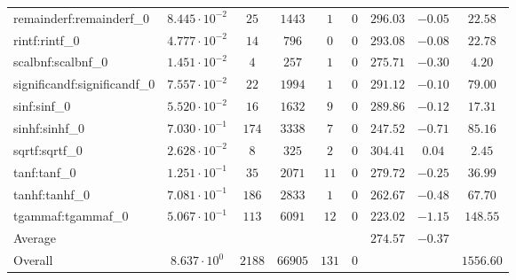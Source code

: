 \begin{tabular}{|l|c|c|c|c|c|c|c|c|}
remainderf:remainderf\_0     & $ 8.445 \cdot 10^{-2} $ & $ 25     $ & $ 1443  $ & $ 1   $ & $ 0   $ & $ 296.03      $ & $ -0.05   $ & $ 22.58   $ \\
rintf:rintf\_0               & $ 4.777 \cdot 10^{-2} $ & $ 14     $ & $ 796   $ & $ 0   $ & $ 0   $ & $ 293.08      $ & $ -0.08   $ & $ 22.78   $ \\
scalbnf:scalbnf\_0           & $ 1.451 \cdot 10^{-2} $ & $ 4      $ & $ 257   $ & $ 1   $ & $ 0   $ & $ 275.71      $ & $ -0.30   $ & $ 4.20    $ \\
significandf:significandf\_0 & $ 7.557 \cdot 10^{-2} $ & $ 22     $ & $ 1994  $ & $ 1   $ & $ 0   $ & $ 291.12      $ & $ -0.10   $ & $ 79.00   $ \\
sinf:sinf\_0                 & $ 5.520 \cdot 10^{-2} $ & $ 16     $ & $ 1632  $ & $ 9   $ & $ 0   $ & $ 289.86      $ & $ -0.12   $ & $ 17.31   $ \\
sinhf:sinhf\_0               & $ 7.030 \cdot 10^{-1} $ & $ 174    $ & $ 3338  $ & $ 7   $ & $ 0   $ & $ 247.52      $ & $ -0.71   $ & $ 85.16   $ \\
sqrtf:sqrtf\_0               & $ 2.628 \cdot 10^{-2} $ & $ 8      $ & $ 325   $ & $ 2   $ & $ 0   $ & $ 304.41      $ & $ 0.04    $ & $ 2.45    $ \\
tanf:tanf\_0                 & $ 1.251 \cdot 10^{-1} $ & $ 35     $ & $ 2071  $ & $ 11  $ & $ 0   $ & $ 279.72      $ & $ -0.25   $ & $ 36.99   $ \\
tanhf:tanhf\_0               & $ 7.081 \cdot 10^{-1} $ & $ 186    $ & $ 2833  $ & $ 1   $ & $ 0   $ & $ 262.67      $ & $ -0.48   $ & $ 67.70   $ \\
tgammaf:tgammaf\_0           & $ 5.067 \cdot 10^{-1} $ & $ 113    $ & $ 6091  $ & $ 12  $ & $ 0   $ & $ 223.02      $ & $ -1.15   $ & $ 148.55  $ \\
\hline
Average                      & $                     $ & $        $ & $       $ & $     $ & $     $ & $ 274.57      $ & $ -0.37   $ & $         $ \\
\hline
Overall                      & $ 8.637 \cdot 10^{0}  $ & $ 2188   $ & $ 66905 $ & $ 131 $ & $ 0   $ & $             $ & $         $ & $ 1556.60 $ \\
\hline
\end{tabular}
